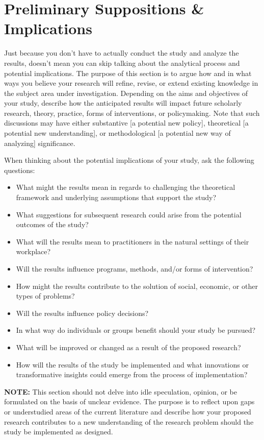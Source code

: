 \documentclass[10pt,twocolumn,letterpaper]{article}
\begin{document}
\section{Preliminary Suppositions \& Implications}
Just because you don't have to actually conduct the study and analyze the results, doesn't mean you can skip talking about the analytical process and potential implications. The purpose of this section is to argue how and in what ways you believe your research will refine, revise, or extend existing knowledge in the subject area under investigation. Depending on the aims and objectives of your study, describe how the anticipated results will impact future scholarly research, theory, practice, forms of interventions, or policymaking. Note that such discussions may have either substantive [a potential new policy], theoretical [a potential new understanding], or methodological [a potential new way of analyzing] significance.
 
When thinking about the potential implications of your study, ask the following questions:
\begin{itemize}
    \item What might the results mean in regards to challenging the theoretical framework and underlying assumptions that support the study?
    \item What suggestions for subsequent research could arise from the potential outcomes of the study?
    \item What will the results mean to practitioners in the natural settings of their workplace?
    \item Will the results influence programs, methods, and/or forms of intervention?
    \item How might the results contribute to the solution of social, economic, or other types of problems?
    \item Will the results influence policy decisions?
    \item In what way do individuals or groups benefit should your study be pursued?
    \item What will be improved or changed as a result of the proposed research?
    \item How will the results of the study be implemented and what innovations or transformative insights could emerge from the process of implementation?
\end{itemize}

\textbf{NOTE:} This section should not delve into idle speculation, opinion, or be formulated on the basis of unclear evidence. The purpose is to reflect upon gaps or understudied areas of the current literature and describe how your proposed research contributes to a new understanding of the research problem should the study be implemented as designed.
\end{document}
